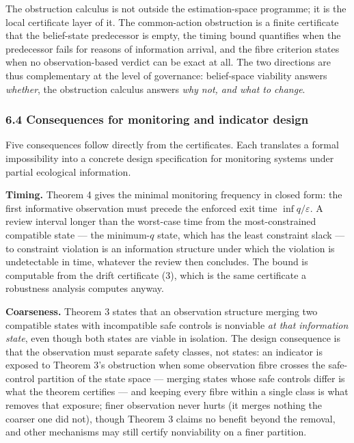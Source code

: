 \documentclass[11pt]{article}
\begin{document}
The obstruction calculus is not outside the estimation-space programme;
it is the local certificate layer of it. The common-action obstruction
is a finite certificate that the belief-state predecessor is empty, the
timing bound quantifies when the predecessor fails for reasons of
information arrival, and the fibre criterion states when no
observation-based verdict can be exact at all. The two directions are
thus complementary at the level of governance: belief-space viability
answers \emph{whether}, the obstruction calculus answers \emph{why not,
and what to change}.

\subsubsection{6.4 Consequences for monitoring and indicator
design}\label{consequences-for-monitoring-and-indicator-design}

Five consequences follow directly from the certificates. Each translates
a formal impossibility into a concrete design specification for
monitoring systems under partial ecological information.

\textbf{Timing.} Theorem 4 gives the minimal monitoring frequency in
closed form: the first informative observation must precede the enforced
exit time \(\inf q / \varepsilon\). A review interval longer than the
worst-case time from the most-constrained compatible state --- the
minimum-\(q\) state, which has the least constraint slack --- to
constraint violation is an information structure under which the
violation is undetectable in time, whatever the review then concludes.
The bound is computable from the drift certificate (3), which is the
same certificate a robustness analysis computes anyway.

\textbf{Coarseness.} Theorem 3 states that an observation structure
merging two compatible states with incompatible safe controls is
nonviable \emph{at that information state}, even though both states are
viable in isolation. The design consequence is that the observation must
separate safety classes, not states: an indicator is exposed to Theorem
3's obstruction when some observation fibre crosses the safe-control
partition of the state space --- merging states whose safe controls
differ is what the theorem certifies --- and keeping every fibre within
a single class is what removes that exposure; finer observation never
hurts (it merges nothing the coarser one did not), though Theorem 3
claims no benefit beyond the removal, and other mechanisms may still
certify nonviability on a finer partition.
\end{document}
